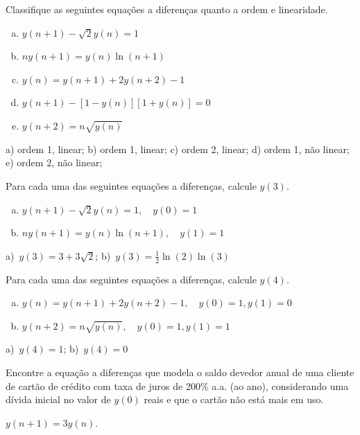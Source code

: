 \begin{exer}
  Classifique as seguintes equações a diferenças quanto a ordem e linearidade.
  \begin{enumerate}[a)]
  \item $\displaystyle y(n+1)-\sqrt{2}y(n) = 1$
  \item $\displaystyle ny(n+1) = y(n)\ln(n+1)$
  \item $\displaystyle y(n) = y(n+1) + 2y(n+2) - 1$
  \item $\displaystyle y(n+1) - \left[1-y(n)\right]\left[1+y(n)\right] = 0$
  \item $\displaystyle y(n+2) = n\sqrt{y(n)}$
  \end{enumerate}
\end{exer}
\begin{resp}
  a) ordem 1, linear; b) ordem 1, linear; c) ordem 2, linear; d) ordem 1, não linear; e) ordem 2, não linear;
\end{resp}

\begin{exer}
  Para cada uma das seguintes equações a diferenças, calcule $y(3)$.
  \begin{enumerate}[a)]
  \item $\displaystyle y(n+1)-\sqrt{2}y(n) = 1,\quad y(0)=1$
  \item $\displaystyle ny(n+1) = y(n)\ln(n+1),\quad y(1)=1$
  \end{enumerate}
\end{exer}
\begin{resp}
  a)~$y(3)=3+3\sqrt{2}$; b)~$y(3)=\frac{1}{2}\ln(2)\ln(3)$
\end{resp}

\begin{exer}
  Para cada uma das seguintes equações a diferenças, calcule $y(4)$.
  \begin{enumerate}[a)]
  \item $\displaystyle y(n) = y(n+1) + 2y(n+2) - 1,\quad y(0)=1, y(1)=0$
  \item $\displaystyle y(n+2) = n\sqrt{y(n)},\quad y(0)=1, y(1)=1$
  \end{enumerate}
\end{exer}
\begin{resp}
  a)~$y(4)=1$; b)~$y(4)=0$
\end{resp}

\begin{exer}
  Encontre a equação a diferenças que modela o saldo devedor anual de uma cliente de cartão de crédito com taxa de juros de 200\% a.a. (ao ano), considerando uma dívida inicial no valor de $y(0)$ reais e que o cartão não está mais em uso.
\end{exer}
\begin{resp}
  $y(n+1) = 3y(n)$.
\end{resp}

